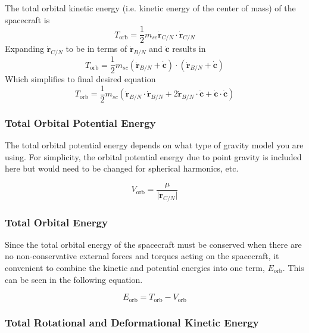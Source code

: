 The total orbital kinetic energy (i.e. kinetic energy of the center of mass) of the spacecraft is
\begin{equation}
T_{\text{orb}} = \frac{1}{2} m_{sc} \dot{\bm r}_{C/N} \cdot \dot{\bm r}_{C/N}
\end{equation}
Expanding $\dot{\bm r}_{C/N}$ to be in terms of $\dot{\bm r}_{B/N}$ and $\dot{\bm c}$ results in
\begin{equation}
T_{\text{orb}} = \frac{1}{2} m_{sc} (\dot{\bm r}_{B/N} + \dot{\bm c}) \cdot (\dot{\bm r}_{B/N} + \dot{\bm c})
\end{equation}
Which simplifies to final desired equation
\begin{equation}
T_{\text{orb}} = \frac{1}{2} m_{sc} (\dot{\bm r}_{B/N}\cdot \dot{\bm r}_{B/N} + 2 \dot{\bm r}_{B/N} \cdot \dot{\bm c} + \dot{\bm c} \cdot \dot{\bm c})
\end{equation}

\subsubsection{Total Orbital Potential Energy}

The total orbital potential energy depends on what type of gravity model you are using. For simplicity, the orbital potential energy due to point gravity is included here but would need to be changed for spherical harmonics, etc.

\begin{equation}
V_{\text{orb}} = \frac{\mu}{\vert \bm r_{C/N} \vert}
\end{equation}

\subsubsection{Total Orbital Energy}

Since the total orbital energy of the spacecraft must be conserved when there are no non-conservative external forces and torques acting on the spacecraft, it convenient to combine the kinetic and potential energies into one term, $E_{\text{orb}}$. This can be seen in the following equation.

\begin{equation}
E_{\text{orb}} = T_{\text{orb}} - V_{\text{orb}}
\end{equation}

\subsubsection{Total Rotational and Deformational Kinetic Energy}

